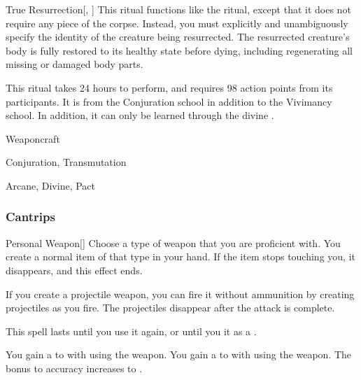 \lowercase{\hypertarget{spell:True Resurrection}{}}\label{spell:True Resurrection}
\begin{apability}[Rank 8]{\hypertarget{spell:True Resurrection}{True Resurrection}}[, ]
This ritual functions like the  ritual, except that it does not require any piece of the corpse.
Instead, you must explicitly and unambiguously specify the identity of the creature being resurrected.
The resurrected creature's body is fully restored to its healthy state before dying, including regenerating all missing or damaged body parts.

This ritual takes 24 hours to perform, and requires 98 action points from its participants.
It is from the Conjuration school in addition to the Vivimancy school.
In addition, it can only be learned through the divine .
\end{apability}
\vspace{0.25em}


\newpage
\begin{spellsection}{Weaponcraft}

\begin{spellheader}
\end{spellheader}


 Conjuration, Transmutation

 Arcane, Divine, Pact

\subsubsection{Cantrips}


\begin{freeability}{Personal Weapon}[]
Choose a type of weapon that you are proficient with.
You create a normal item of that type in your hand.
If the item stops touching you, it disappears, and this effect ends.

If you create a projectile weapon, you can fire it without ammunition by creating projectiles as you fire.
The projectiles disappear after the attack is complete.

This spell lasts until you use it again, or until you  it as a .

\rankline
{} You gain a   to  with  using the weapon.
 You gain a   to  with  using the weapon.
 The bonus to accuracy increases to .
\end{freeability}

\end{spellsection}



